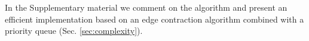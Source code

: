 In the Supplementary material we comment on the algorithm  and present an efficient implementation based on an edge contraction algorithm combined with a priority queue (Sec. \ref{sec:complexity}).







